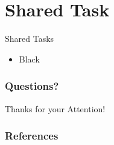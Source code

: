 \documentclass[handout]{beamer}
\begin{document}
\section{Shared Task}


\begin{frame}{Shared Tasks}
\begin{scriptsize}

\begin{itemize}
\item Black
\end{itemize}


\end{scriptsize}
\end{frame}


\begin{frame}
\frametitle{Questions?}
\begin{center}\LARGE Thanks for your Attention!\\ \end{center}



\end{frame}

\begin{frame}[allowframebreaks]\scriptsize
\frametitle{References}


%
\end{frame}  


\end{document}
